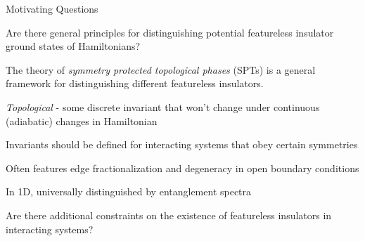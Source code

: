 \begin{frame}{Motivating Questions}
\vskip -1.5cm

Are there general principles for distinguishing potential featureless insulator ground states of Hamiltonians?

The theory of {\em symmetry protected topological phases} (SPTs) is a general framework for distinguishing different featureless insulators.

\bi 
\item {\em Topological} - some discrete invariant that won't change under continuous (adiabatic) changes in Hamiltonian
\item Invariants should be defined for interacting systems that obey certain symmetries 
\item Often features edge fractionalization and degeneracy in open boundary conditions
\item In 1D, universally distinguished by entanglement spectra
\ei

Are there additional constraints on the existence of featureless insulators in interacting systems?


\end{frame}